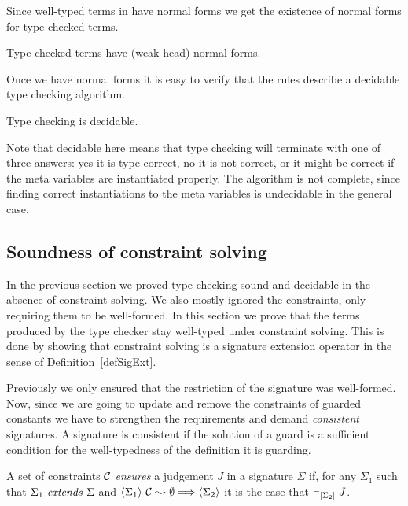 Since well-typed terms in {\Core} have normal forms we get the existence of
normal forms for type checked terms.

\begin{corollary}
    Type checked terms have (weak head) normal forms.
\end{corollary}

Once we have normal forms it is easy to verify that the rules describe a
decidable type checking algorithm.

\begin{corollary}
    Type checking is decidable.
\end{corollary}

Note that decidable here means that type checking will terminate with one of
three answers: yes it is type correct, no it is not correct, or it might be
correct if the meta variables are instantiated properly. The algorithm is not
complete, since finding correct instantiations to the meta variables is
undecidable in the general case.

\subsection{Soundness of constraint solving}

In the previous section we proved type checking sound and decidable in the
absence of constraint solving. We also mostly ignored the constraints, only
requiring them to be well-formed. In this section we prove that the terms
produced by the type checker stay well-typed under constraint solving. This is
done by showing that constraint solving is a signature extension operator in
the sense of Definition~\ref{defSigExt}.

Previously we only ensured that the {\Core} restriction of the signature was
well-formed. Now, since we are going to update and remove the constraints of
guarded constants we have to strengthen the requirements and demand {\em
consistent} signatures. A signature is consistent if the solution of a guard is
a sufficient condition for the well-typedness of the definition it is guarding.

\begin{definition}[Ensures] \label{defEnsures}
    A set of constraints $\mathcal{C}$ {\em ensures} a {\Core} judgement $J$ in a signature
    $\Sigma$ if, for any $\Sigma_1$ such that
    ${\Sigma_1} ~ \mathit{extends} ~ {\Sigma}$ and
    $\langle {\Sigma_1} \rangle ~ {{\mathcal{C}} \leadsto {\emptyset}} \Longrightarrow \langle {\Sigma_2} \rangle$
    it is the case that $\vdash_{\left|{\Sigma_2}\right|} J$.
\end{definition}


